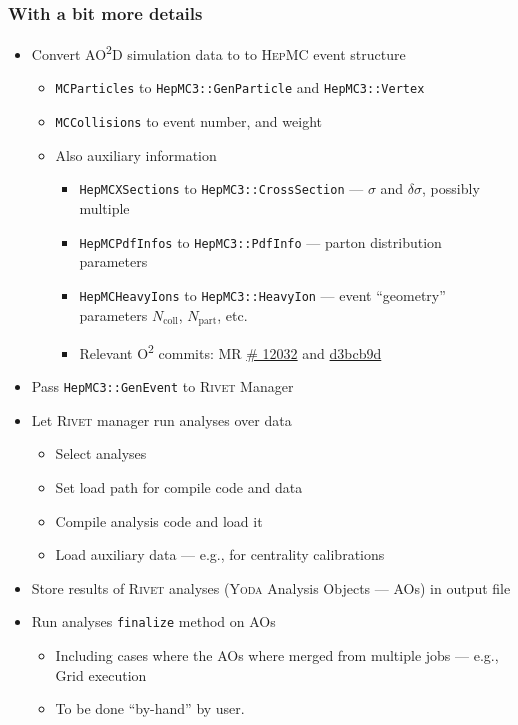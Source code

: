 \documentclass[compress,table,8pt]{beamer}
\newcommand\Rivet{{\scshape Rivet}}
\newcommand\Yoda{{\scshape Yoda}}
\newcommand\HepMC{{\scshape HepMC}}
\newcommand\Otwo{O\textsuperscript{2}}
\newcommand\AOD{AO\textsuperscript{2}D}
\begin{document}
\begin{frame}
  \frametitle{With a bit more details}
  \begin{itemize}
  \item<+-> Convert \AOD{} simulation data to to \HepMC{} event structure
    \begin{itemize}
    \item \texttt{MCParticles} to \texttt{HepMC3::GenParticle} and
      \texttt{HepMC3::Vertex}
    \item \texttt{MCCollisions} to event number, and weight
    \item Also auxiliary information
      \begin{itemize}
      \item \texttt{HepMCXSections} to \texttt{HepMC3::CrossSection}
        --- $\sigma$ and $\delta\sigma$, possibly multiple
      \item \texttt{HepMCPdfInfos} to \texttt{HepMC3::PdfInfo} ---
        parton distribution parameters
      \item \texttt{HepMCHeavyIons} to \texttt{HepMC3::HeavyIon} ---
        event ``geometry'' parameters $N_{\mathrm{coll}}$,
        $N_{\mathrm{part}}$, etc.
      \item Relevant \Otwo{} commits: MR
        \href{https://github.com/AliceO2Group/AliceO2/pull/12032/commits}{\#
          12032} and
        \href{https://github.com/AliceO2Group/AliceO2/commit/d3bcb9d5c98a14618e100c4d476103b8f5989ae1}{d3bcb9d}
      \end{itemize}
    \end{itemize}
  \item<+-> Pass \texttt{HepMC3::GenEvent} to \Rivet{} Manager
  \item<+-> Let \Rivet{} manager run analyses over data
    \begin{itemize}
    \item Select analyses
    \item Set load path for compile code and data
    \item Compile analysis code and load it
    \item Load auxiliary data --- e.g., for centrality calibrations
    \end{itemize}
  \item<+-> Store results of \Rivet{} analyses (\Yoda{} Analysis Objects
    --- AOs) in output file
  \item<+-> Run analyses \texttt{finalize} method on AOs
    \begin{itemize}
    \item Including cases where the AOs where merged from multiple
      jobs --- e.g., Grid execution
    \item To be done ``by-hand'' by user.
    \end{itemize}
  \end{itemize}
\end{frame}
\end{document}
